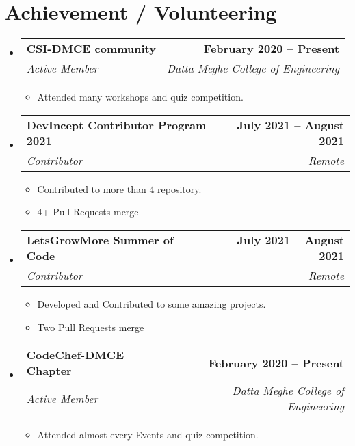 \documentclass[letterpaper,11pt]{article}
\makeatletter
\newcommand{\resumeItem}[1]{
  \item\small{
    {#1 \vspace{-2pt}}
  }
}
\newcommand{\resumeSubheading}[4]{
  \vspace{-2pt}\item
    \begin{tabular*}{1.0\textwidth}[t]{l@{\extracolsep{\fill}}r}
      \textbf{#1} & \textbf{\small #2} \\
      \textit{\small#3} & \textit{\small #4} \\
    \end{tabular*}\vspace{-7pt}
}
\newcommand{\resumeSubHeadingListStart}{\begin{itemize}[leftmargin=0.0in, label={}]}
\newcommand{\resumeSubHeadingListEnd}{\end{itemize}}
\newcommand{\resumeItemListStart}{\begin{itemize}}
\newcommand{\resumeItemListEnd}{\end{itemize}\vspace{-5pt}}
\makeatother
\begin{document}
\section{Achievement / Volunteering}
    \resumeSubHeadingListStart
        \resumeSubheading{CSI-DMCE community}{February 2020 -- Present}{Active Member}{Datta Meghe College of Engineering}
            \resumeItemListStart
                \resumeItem{Attended many workshops and quiz competition.}
            \resumeItemListEnd
        \vspace{10pt}
        \resumeSubheading{DevIncept Contributor Program 2021}{July 2021 -- August 2021}{Contributor}{Remote}
            \resumeItemListStart
                \resumeItem{Contributed to more than 4 repository.}
                \resumeItem{4+ Pull Requests merge}
            \resumeItemListEnd
         \vspace{10pt}
        \resumeSubheading{LetsGrowMore Summer of Code}{July 2021 -- August 2021}{Contributor}{Remote}
            \resumeItemListStart
                \resumeItem{Developed and Contributed to some amazing projects.}
                \resumeItem{Two Pull Requests merge}
            \resumeItemListEnd
         \vspace{10pt}
        \resumeSubheading{CodeChef-DMCE Chapter}{February 2020 -- Present}{Active Member}{Datta Meghe College of Engineering}
            \resumeItemListStart
                \resumeItem{Attended almost every Events and quiz competition.}
            \resumeItemListEnd
        
    \resumeSubHeadingListEnd
\end{document}
